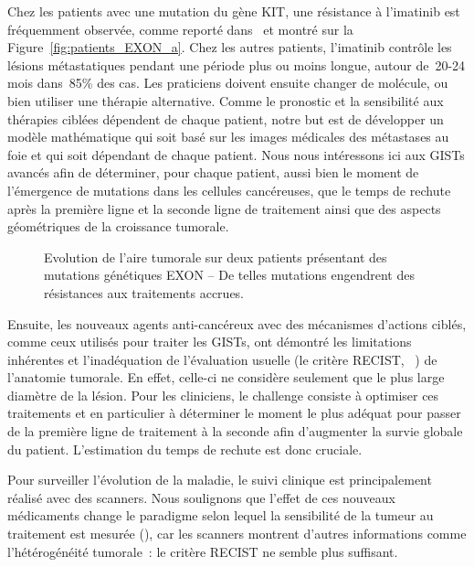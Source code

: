 \documentclass[main.tex]{subfiles}
\begin{document}
Chez les patients avec une mutation du gène KIT, une résistance à l'imatinib est fréquemment observée, comme reporté dans~\cite{Blay2011} et montré sur la Figure~\ref{fig:patients_EXON_a}. 
Chez les autres patients, l'imatinib contrôle les lésions métastatiques pendant une période plus ou moins longue, autour de~20-24 mois dans~85\% des cas. 
Les praticiens doivent ensuite changer de molécule, ou bien utiliser une thérapie alternative. 
Comme le pronostic et la sensibilité aux thérapies ciblées dépendent de chaque patient, notre but est de développer un modèle mathématique qui soit basé sur les images médicales des métastases au foie et qui soit dépendant de chaque patient. 
Nous nous intéressons ici aux GISTs avancés afin de déterminer, pour chaque patient, aussi bien le moment de l'émergence de mutations dans les cellules cancéreuses, que le temps de rechute après la première ligne et la seconde ligne de traitement ainsi que des aspects géométriques de la croissance tumorale.

\begin{figure}
\hfill
{}
\caption{\label{fig:patients_EXON}Evolution de l'aire tumorale sur deux patients présentant des mutations génétiques EXON -- De telles mutations engendrent des résistances aux traitements accrues.}
\end{figure}


Ensuite, les nouveaux agents anti-cancéreux avec des mécanismes d'actions ciblés, comme ceux utilisés pour traiter les GISTs, ont démontré les limitations inhérentes et l'inadéquation de  l'évaluation usuelle (\ie le critère RECIST, \cf~\cite{suzuki2008}) de l'anatomie tumorale. En effet, celle-ci ne considère seulement que le plus large diamètre de la lésion. 
Pour les cliniciens, le challenge consiste à optimiser ces traitements et en particulier à déterminer le moment le plus adéquat pour passer de la première ligne de traitement à la seconde afin d'augmenter la survie globale du patient. L'estimation du temps de rechute est donc cruciale.


Pour surveiller l'évolution de la maladie, le suivi clinique est principalement réalisé avec des scanners. 
Nous soulignons que l'effet de ces nouveaux médicaments change le paradigme selon lequel la sensibilité de la tumeur au traitement est mesurée (\cf \cite{schramm2013}), car les scanners montrent d'autres informations comme l'hétérogénéité tumorale~: le critère RECIST ne semble plus suffisant.
\end{document}
